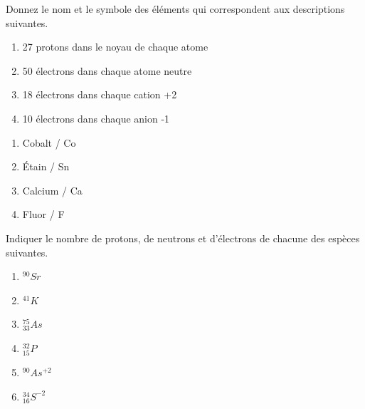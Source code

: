 \documentclass[
  11pt,
  a4paper,
  openany]{book}
\providecommand{\tightlist}{%
  \setlength{\itemsep}{0pt}\setlength{\parskip}{0pt}}
\begin{document}
\newpage

\begin{Exercise}

Donnez le nom et le symbole des éléments qui correspondent aux descriptions suivantes.

\begin{enumerate}
\def\labelenumi{\arabic{enumi}.}
\tightlist
\item
  27 protons dans le noyau de chaque atome\\
\item
  50 électrons dans chaque atome neutre\\
\item
  18 électrons dans chaque cation +2\\
\item
  10 électrons dans chaque anion -1
\end{enumerate}

\end{Exercise}

\begin{Answer}

\begin{enumerate}
\def\labelenumi{\arabic{enumi}.}
\tightlist
\item
  Cobalt / Co
\item
  Étain / Sn
\item
  Calcium / Ca
\item
  Fluor / F
\end{enumerate}

\end{Answer}

\begin{Exercise}

Indiquer le nombre de protons, de neutrons et d'électrons de chacune des espèces suivantes.

\begin{enumerate}
\def\labelenumi{\arabic{enumi}.}
\tightlist
\item
  \(^{90}Sr\)\\
\item
  \(^{41}K\)\\
\item
  \(^{75}_{33}As\)\\
\item
  \(^{32}_{15}P\)\\
\item
  \(^{90}As^{+2}\)\\
\item
  \(^{34}_{16}S^{-2}\)
\end{enumerate}

\end{Exercise}
\end{document}
